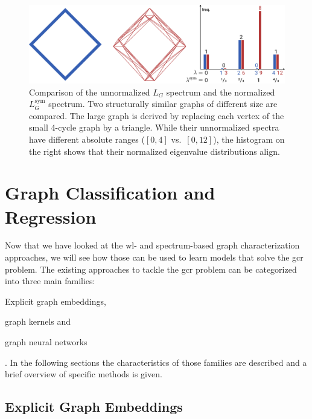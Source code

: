\begin{figure}[ht]
	\centering
	\includegraphics[width=\linewidth]{gfx/related-work/spectral-normalization.pdf}
	\caption[Comparison of the unnormalized $L_G$ spectrum and the normalized $L^{\text{sym}}_G$ spectrum.]{
		Comparison of the unnormalized $L_G$ spectrum and the normalized $L^{\text{sym}}_G$ spectrum.
		Two structurally similar graphs of different size are compared.
		The \textcolor{t_red}{large graph} is derived by replacing each vertex of the \textcolor{t_blue}{small 4-cycle graph} by a triangle.
		While their unnormalized spectra have different absolute ranges (\textcolor{t_blue}{$[0, 4]$} vs.\ \textcolor{t_red}{$[0, 12]$}), the histogram on the right shows that their normalized eigenvalue distributions align.
	}\label{fig:related:spectral-normalization}
\end{figure}

\section{Graph Classification and Regression}%
\label{sec:related:gcr}

Now that we have looked at the \acs{wl}- and spectrum-based graph characterization approaches, we will see how those can be used to learn models that solve the \acf{gcr} problem.
The existing approaches to tackle the \ac{gcr} problem can be categorized into three main families:
\begin{enumerate*}
	\item Explicit graph embeddings,
	\item graph kernels and
	\item graph neural networks
\end{enumerate*}.
In the following sections the characteristics of those families are described and a brief overview of specific methods is given.

\subsection{Explicit Graph Embeddings}%
\label{sec:related:gcr:embed}


